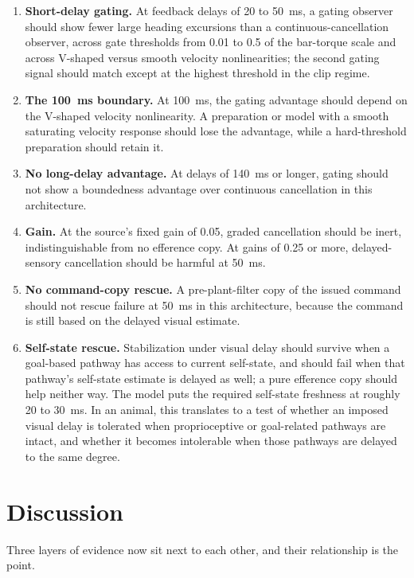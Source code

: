 \documentclass[pdflatex,sn-nature]{sn-jnl}
\begin{document}
\begin{enumerate}
\item \textbf{Short-delay gating.} At feedback delays of 20 to 50~ms, a gating observer should show fewer large heading excursions than a continuous-cancellation observer, across gate thresholds from 0.01 to 0.5 of the bar-torque scale and across V-shaped versus smooth velocity nonlinearities; the second gating signal should match except at the highest threshold in the clip regime.
\item \textbf{The 100~ms boundary.} At 100~ms, the gating advantage should depend on the V-shaped velocity nonlinearity. A preparation or model with a smooth saturating velocity response should lose the advantage, while a hard-threshold preparation should retain it.
\item \textbf{No long-delay advantage.} At delays of 140~ms or longer, gating should not show a boundedness advantage over continuous cancellation in this architecture.
\item \textbf{Gain.} At the source's fixed gain of 0.05, graded cancellation should be inert, indistinguishable from no efference copy. At gains of 0.25 or more, delayed-sensory cancellation should be harmful at 50~ms.
\item \textbf{No command-copy rescue.} A pre-plant-filter copy of the issued command should not rescue failure at 50~ms in this architecture, because the command is still based on the delayed visual estimate.
\item \textbf{Self-state rescue.} Stabilization under visual delay should survive when a goal-based pathway has access to current self-state, and should fail when that pathway's self-state estimate is delayed as well; a pure efference copy should help neither way. The model puts the required self-state freshness at roughly 20 to 30~ms. In an animal, this translates to a test of whether an imposed visual delay is tolerated when proprioceptive or goal-related pathways are intact, and whether it becomes intolerable when those pathways are delayed to the same degree.
\end{enumerate}

\section{Discussion}\label{sec:discussion}

Three layers of evidence now sit next to each other, and their relationship is the point.
\end{document}
